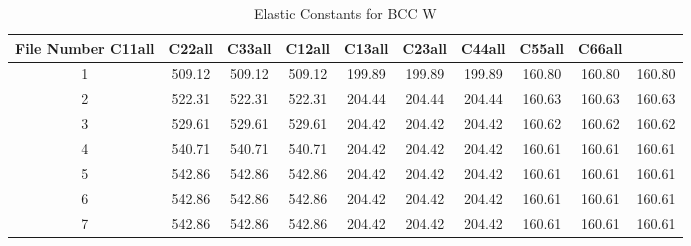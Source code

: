 \begin{table}[h!]
\centering
\begin{tabular}{|c|c|c|c|c|c|c|c|c|c|}
\hline
File Number C11all & C22all & C33all & C12all & C13all & C23all & C44all & C55all & C66all \\
\hline
1 & 509.12 & 509.12 & 509.12 & 199.89 & 199.89 & 199.89 & 160.80 & 160.80 & 160.80 \\
\hline
2 & 522.31 & 522.31 & 522.31 & 204.44 & 204.44 & 204.44 & 160.63 & 160.63 & 160.63 \\
\hline
3 & 529.61 & 529.61 & 529.61 & 204.42 & 204.42 & 204.42 & 160.62 & 160.62 & 160.62 \\
\hline
4 & 540.71 & 540.71 & 540.71 & 204.42 & 204.42 & 204.42 & 160.61 & 160.61 & 160.61 \\
\hline
5 & 542.86 & 542.86 & 542.86 & 204.42 & 204.42 & 204.42 & 160.61 & 160.61 & 160.61 \\
\hline
6 & 542.86 & 542.86 & 542.86 & 204.42 & 204.42 & 204.42 & 160.61 & 160.61 & 160.61 \\
\hline
7 & 542.86 & 542.86 & 542.86 & 204.42 & 204.42 & 204.42 & 160.61 & 160.61 & 160.61 \\
\hline
\end{tabular}
\caption{Elastic Constants for BCC W}
\label{tab:elastic_constants}
\end{table}

